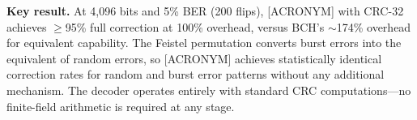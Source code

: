 \textbf{Key result.} At 4,096 bits and 5\% BER (200 flips), [ACRONYM] with CRC-32 achieves $\geq$95\% full correction at 100\% overhead, versus BCH's $\sim$174\% overhead for equivalent capability. The Feistel permutation converts burst errors into the equivalent of random errors, so [ACRONYM] achieves statistically identical correction rates for random and burst error patterns without any additional mechanism. The decoder operates entirely with standard CRC computations---no finite-field arithmetic is required at any stage.

